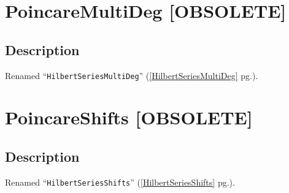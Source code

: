\documentclass[a4paper]{mybook}
\newenvironment{command}{}{} %
\begin{document}
\section{PoincareMultiDeg [OBSOLETE]}
\label{PoincareMultiDeg [OBSOLETE]}
\begin{command} %



\subsection*{Description}

Renamed ``\verb&HilbertSeriesMultiDeg&'' (\ref{HilbertSeriesMultiDeg} pg.\pageref{HilbertSeriesMultiDeg}).

\end{command} %

\section{PoincareShifts [OBSOLETE]}
\label{PoincareShifts [OBSOLETE]}
\begin{command} %



\subsection*{Description}

Renamed ``\verb&HilbertSeriesShifts&'' (\ref{HilbertSeriesShifts} pg.\pageref{HilbertSeriesShifts}).

\end{command} %
\end{document}
